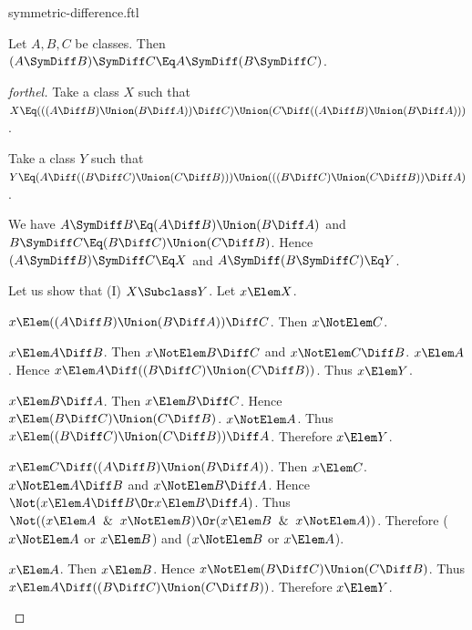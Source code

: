 \documentclass{stex}
\begin{document}
\begin{smodule}{symmetric-difference.ftl}
\begin{proposition*}[forthel]
  Let $A, B, C$ be classes.
  Then $(A \SymDiff B) \SymDiff C \Eq A \SymDiff (B \SymDiff C)$.
\end{proposition*}
\begin{proof}[forthel]
  Take a class $X$ such that $X \Eq (((A \Diff B) \Union (B \Diff A)) \Diff C) \Union (C \Diff ((A \Diff B) \Union (B \Diff A)))$.

  Take a class $Y$ such that $Y \Eq (A \Diff ((B \Diff C) \Union (C \Diff B))) \Union (((B \Diff C) \Union (C \Diff B)) \Diff A)$.

  We have $A \SymDiff B \Eq (A \Diff B) \Union (B \Diff A)$ and $B \SymDiff C \Eq (B \Diff C) \Union (C \Diff B)$.
  Hence $(A \SymDiff B) \SymDiff C \Eq X$ and $A \SymDiff (B \SymDiff C) \Eq Y$.

  Let us show that (I) $X \Subclass Y$.
    Let $x \Elem X$.

    \begin{case}{$x \Elem ((A \Diff B) \Union (B \Diff A)) \Diff C$.}
      Then $x \NotElem C$.

      \begin{case}{$x \Elem A \Diff B$.}
        Then $x \NotElem B \Diff C$ and $x \NotElem C \Diff B$. $x \Elem A$.
        Hence $x \Elem A \Diff ((B \Diff C) \Union (C \Diff B))$.
        Thus $x \Elem Y$.
      \end{case}

      \begin{case}{$x \Elem B \Diff A$.}
        Then $x \Elem B \Diff C$.
        Hence $x \Elem (B \Diff C) \Union (C \Diff B)$. $x \NotElem A$.
        Thus $x \Elem ((B \Diff C) \Union (C \Diff B)) \Diff A$.
        Therefore $x \Elem Y$.
      \end{case}
    \end{case}

    \begin{case}{$x \Elem C \Diff ((A \Diff B) \Union (B \Diff A))$.}
      Then $x \Elem C$.
      $x \NotElem A \Diff B$ and $x \NotElem B \Diff A$.
      Hence $\Not(x \Elem A \Diff B \Or x \Elem B \Diff A)$.
      Thus  $\Not((x \Elem A \And x \NotElem B) \Or (x \Elem B \And x \NotElem A))$.
      Therefore ($x \NotElem A$ or $x \Elem B$) and ($x \NotElem B$ or $x \Elem A$).

      \begin{case}{$x \Elem A$.}
        Then $x \Elem B$.
        Hence $x \NotElem (B \Diff C) \Union (C \Diff B)$.
        Thus $x \Elem A \Diff ((B \Diff C) \Union (C \Diff B))$.
        Therefore $x \Elem Y$.
      \end{case}


\end{case}
\end{proof}
\end{smodule}
\end{document}
